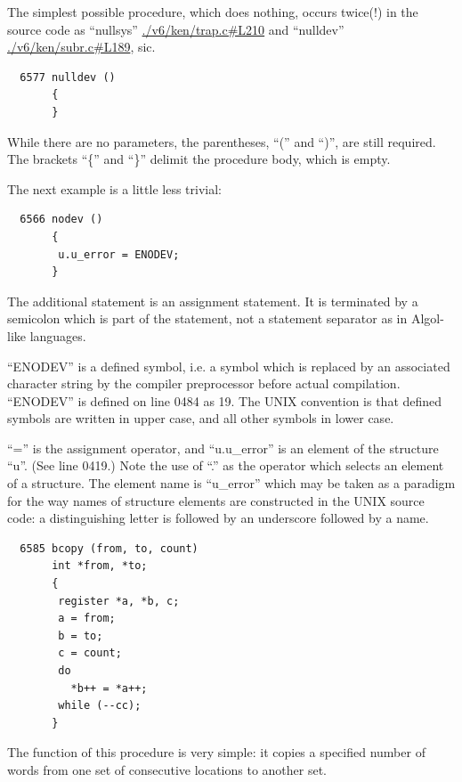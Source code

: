 
The simplest possible procedure, which
does nothing, occurs twice(!) in the
source code as ``nullsys'' \url{./v6/ken/trap.c#L210} and
``nulldev'' \url{./v6/ken/subr.c#L189}, sic.

\newpage
\begin{verbatim}
  6577 nulldev ()
       {
       }
\end{verbatim}

While there are no parameters, the
parentheses, ``('' and ``)'', are still
required. The brackets ``\{'' and ``\}''
delimit the procedure body, which is
empty.


The next example is a little less
trivial:

\begin{verbatim}
  6566 nodev ()
       {
        u.u_error = ENODEV;
       }
\end{verbatim}


The additional statement is an assignment
statement. It is terminated by a
semicolon which is part of the statement,
not a statement separator as in
Algol-like languages.

``ENODEV'' is a defined symbol, i.e. a
symbol which is replaced by an associated
character string by the compiler
preprocessor before actual compilation.
``ENODEV'' is defined on line 0484 as 19.
The UNIX convention is that defined
symbols are written in upper case, and
all other symbols in lower case.

``='' is the assignment operator, and
``u.u\_error'' is an element of the structure
``u''. (See line 0419.) Note the use
of ``.'' as the operator which selects an
element of a structure. The element
name is ``u\_error'' which may be taken as
a paradigm for the way names of structure
elements are constructed in the
UNIX source code: a distinguishing
letter is followed by an underscore
followed by a name.


\begin{verbatim}
  6585 bcopy (from, to, count)
       int *from, *to;
       {
        register *a, *b, c;
        a = from;
        b = to;
        c = count;
        do
          *b++ = *a++;
        while (--cc);
       }
\end{verbatim}

The function of this procedure is very
simple: it copies a specified number of
words from one set of consecutive
locations to another set.

